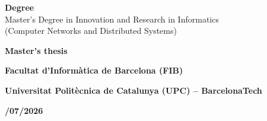 \begin{titlepage}
\begin{center}
\vspace{0.45cm}

{\bfseries\fontsize{12}{14.4}\selectfont Degree}\\[0.15cm]
{\selectfont\fontsize{12}{14.4}\selectfont
Master's Degree in Innovation and Research in Informatics\\[0.05cm]
(Computer Networks and Distributed Systems)}

\vspace{0.9cm}

{\bfseries\fontsize{12}{14.4}\selectfont Master's thesis}

\vspace{0.15cm}

{\bfseries\fontsize{12}{14.4}\selectfont Facultat d'Inform\`{a}tica de Barcelona (FIB)}

\vspace{0.15cm}

{\bfseries\fontsize{12}{14.4}\selectfont Universitat Polit\`{e}cnica de Catalunya (UPC) -- BarcelonaTech}

\vspace{0.6cm}

{\bfseries\fontsize{12}{14.4}/07/2026}

\vspace{0.3cm}
\end{center}

\restoregeometry
\end{titlepage}
